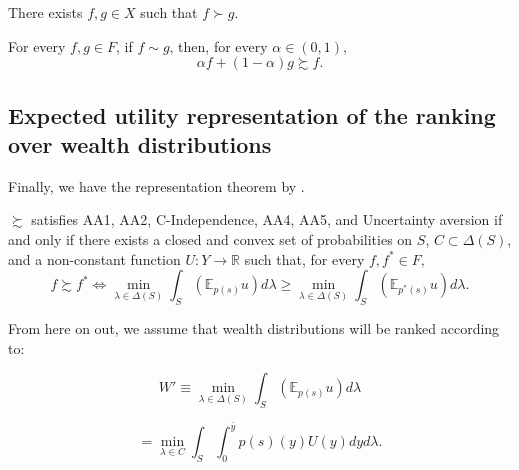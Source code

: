 \documentclass[\econtexRoot/IneqMeas]{subfiles}
\begin{document}
\begin{ax.AA}
There exists $f,g \in X$ such that $f \succ g$.
\end{ax.AA}

\begin{ax.U}
For every $f,g \in F$, if $f \sim g$, then, for every $\alpha \in (0,1)$,
$$ \alpha f + (1-\alpha)g \succsim f. $$
\end{ax.U}

\subsection{Expected utility representation of the ranking over wealth distributions}

\par  Finally, we have the representation theorem by \cite{gs89}.



\begin{tm}
$\succsim $ satisfies AA1, AA2, C-Independence, AA4, AA5, and Uncertainty aversion if and only if there exists a closed and convex set of probabilities on $S$, $C \subset \Delta(S)$, and a non-constant function $U: Y \to \mathbb{R}$ such that, for every $f, f^* \in F,$
$$ f \succsim f^* \iff \min_{\lambda \in \Delta(S)} \int_{S} (\mathbb{E}_{p(s)} u) d \lambda  \geq \min_{\lambda \in \Delta(S)} \int_{S} (\mathbb{E}_{p^{*}(s)} u) d \lambda.$$
\end{tm}

From here on out, we assume that wealth distributions will be ranked according to:

$$ W' \equiv \min_{\lambda \in \Delta(S)} \int_{S} (\mathbb{E}_{p(s)} u) d \lambda $$

$$ = \min_{\lambda \in C} \int_{S} \int_{0}^{\bar{y}} p(s)(y) U(y) dy d\lambda. $$


\onlyinsubfile{}

\end{document}
